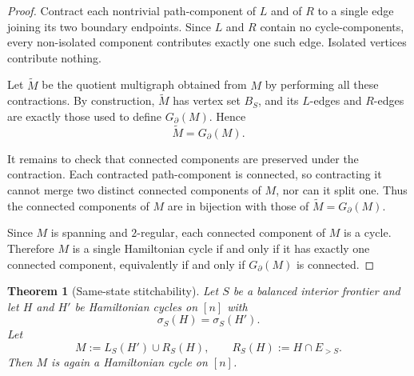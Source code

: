 \documentclass[11pt]{article}
\newtheorem{theorem}{Theorem}[section]
\begin{document}
\begin{proof}
Contract each nontrivial path-component of $L$ and of $R$ to a single edge joining its two boundary
endpoints. Since $L$ and $R$ contain no cycle-components, every non-isolated component contributes
exactly one such edge. Isolated vertices contribute nothing.

Let $\widetilde M$ be the quotient multigraph obtained from $M$ by performing all these contractions.
By construction, $\widetilde M$ has vertex set $B_S$, and its $L$-edges and $R$-edges are exactly those
used to define $G_\partial(M)$. Hence
\[
\widetilde M = G_\partial(M).
\]

It remains to check that connected components are preserved under the contraction. Each contracted
path-component is connected, so contracting it cannot merge two distinct connected components of $M$,
nor can it split one. Thus the connected components of $M$ are in bijection with those of
$\widetilde M=G_\partial(M)$.

Since $M$ is spanning and $2$-regular, each connected component of $M$ is a cycle. Therefore $M$
is a single Hamiltonian cycle if and only if it has exactly one connected component, equivalently
if and only if $G_\partial(M)$ is connected.
\end{proof}

\begin{theorem}[Same-state stitchability]\label{thm:stitchability}
Let $S$ be a balanced interior frontier and let $H$ and $H'$ be
Hamiltonian cycles on $[n]$ with
\[
\sigma_S(H)=\sigma_S(H').
\]
Let
\[
M := L_S(H') \cup R_S(H),
\qquad
R_S(H):=H\cap E_{>S}.
\]
Then $M$ is again a Hamiltonian cycle on $[n]$.
\end{theorem}
\end{document}
